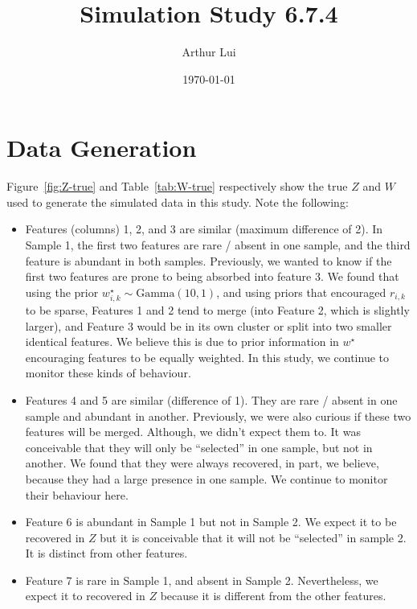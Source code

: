 \documentclass[10pt]{article} %
\title{Simulation Study 6.7.4}
\author{Arthur Lui}
\date{\today} %
\newcommand{\Gam}{ \text{Gamma} }
\begin{document}
\maketitle



\section{Data Generation}\label{sec:data-generation}
Figure~\ref{fig:Z-true} and Table~\ref{tab:W-true} respectively show the true
$Z$ and $W$ used to generate the simulated data in this study. Note the following:
\begin{itemize}
  \item Features (columns) 1, 2, and 3 are similar (maximum difference of 2).
    In Sample 1, the first two features are rare / absent in one sample, and
    the third feature is abundant in both samples. Previously, we wanted to
    know if the first two features are prone to being absorbed into feature 3. We
    found that using the prior $w^\star_{i,k} \sim \Gam(10, 1)$, and using priors
    that encouraged $r_{i,k}$ to be sparse, Features 1 and 2 tend to merge
    (into Feature 2, which is slightly larger), and Feature 3 would be in its
    own cluster or split into two smaller identical features. We believe this is 
    due to prior information in $w^\star$ encouraging features to be equally weighted.
    In this study, we continue to monitor these kinds of behaviour.
  \item Features 4 and 5 are similar (difference of 1). They are rare / absent
    in one sample and abundant in another. Previously, we were also curious if
    these two features will be merged. Although, we didn't expect them to. It was
    conceivable that they will only be ``selected'' in one sample, but not in
    another. We found that they were always recovered, in part, we believe, because
    they had a large presence in one sample. We continue to monitor their behaviour
    here.
  \item Feature 6 is abundant in Sample 1 but not in Sample 2. We expect it to be
    recovered in $Z$ but it is conceivable that it will not be ``selected'' in sample
    2. It is distinct from other features.
  \item Feature 7 is rare in Sample 1, and absent in Sample 2. Nevertheless, we
    expect it to recovered in $Z$ because it is different from the other
    features.
\end{itemize}
\end{document}
